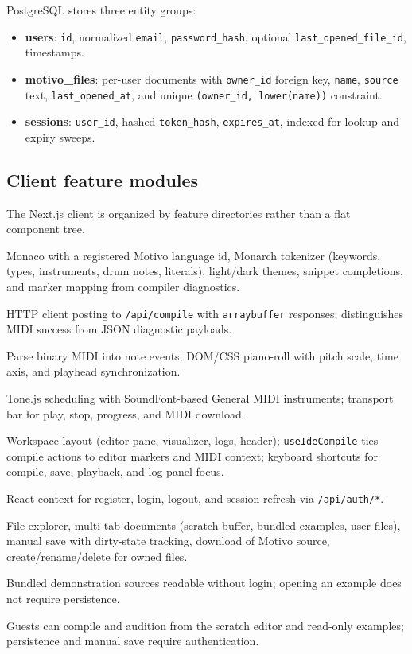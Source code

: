 PostgreSQL stores three entity groups:

\begin{itemize}
  \item \textbf{users}: \texttt{id}, normalized \texttt{email}, \texttt{password\_hash}, optional
    \texttt{last\_opened\_file\_id}, timestamps.
  \item \textbf{motivo\_files}: per-user documents with \texttt{owner\_id} foreign key, \texttt{name},
    \texttt{source} text, \texttt{last\_opened\_at}, and unique \texttt{(owner\_id, lower(name))} constraint.
  \item \textbf{sessions}: \texttt{user\_id}, hashed \texttt{token\_hash}, \texttt{expires\_at}, indexed for lookup
    and expiry sweeps.
\end{itemize}

\subsection{Client feature modules}\label{subsec:studio-client-modules}

The Next.js client is organized by feature directories rather than a flat component tree.

 Monaco with a registered Motivo language id, Monarch tokenizer
(keywords, types, instruments, drum notes, literals), light/dark themes, snippet completions, and marker mapping from
compiler diagnostics.

 HTTP client posting to \texttt{/api/compile} with
\texttt{arraybuffer} responses; distinguishes MIDI success from JSON diagnostic payloads.

 Parse binary MIDI into
note events; DOM/CSS piano-roll with pitch scale, time axis, and playhead synchronization.

 Tone.js scheduling with SoundFont-based General MIDI
instruments; transport bar for play, stop, progress, and MIDI download.

 Workspace layout (editor pane, visualizer, logs, header);
\texttt{useIdeCompile} ties compile actions to editor markers and MIDI context; keyboard shortcuts for compile, save,
playback, and log panel focus.

 React context for register, login, logout, and session refresh via
\texttt{/api/auth/*}.

 File explorer, multi-tab documents (scratch buffer, bundled examples, user files), manual save with
dirty-state tracking, download of Motivo source, create/rename/delete for owned files.

 Bundled demonstration sources readable without login; opening an example does not require persistence.

Guests can compile and audition from the scratch editor and read-only examples; persistence and manual save require
authentication.
